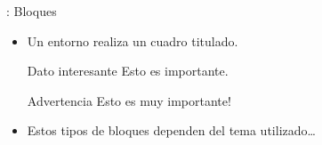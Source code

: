 \documentclass{beamer}
\begin{document}
\begin{frame}[fragile]{\insertsection: Bloques}
  \begin{itemize}
  \item Un entorno   realiza un cuadro titulado.

    \begin{exampletwouptiny}
\begin{block}{Dato interesante}
  Esto es importante.
\end{block}

\begin{alertblock}{Advertencia}
  Esto es muy importante!
\end{alertblock}
    \end{exampletwouptiny}
    
  \item Estos tipos de bloques dependen del tema utilizado\ldots
  \end{itemize}
\end{frame}
\end{document}
